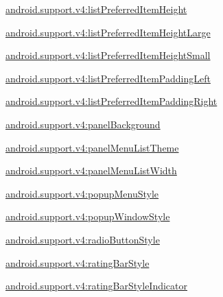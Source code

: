 {\ttfamily \hyperlink{classandroid_1_1support_1_1v4_1_1R_1_1styleable_a9b71c2c15e2b7ab9c0f8f48771d4444e}{android.\+support.\+v4\+:list\+Preferred\+Item\+Height}}

{\ttfamily \hyperlink{classandroid_1_1support_1_1v4_1_1R_1_1styleable_a4bf9947a5a52f076cfc439791fc78ac5}{android.\+support.\+v4\+:list\+Preferred\+Item\+Height\+Large}}

{\ttfamily \hyperlink{classandroid_1_1support_1_1v4_1_1R_1_1styleable_aad0605b48a4d815b0fdc77f1e4dacb4d}{android.\+support.\+v4\+:list\+Preferred\+Item\+Height\+Small}}

{\ttfamily \hyperlink{classandroid_1_1support_1_1v4_1_1R_1_1styleable_ae536509d1f248feded607e1588900608}{android.\+support.\+v4\+:list\+Preferred\+Item\+Padding\+Left}}

{\ttfamily \hyperlink{classandroid_1_1support_1_1v4_1_1R_1_1styleable_af5e021a7f52cfdc13201bf047025d17d}{android.\+support.\+v4\+:list\+Preferred\+Item\+Padding\+Right}}

{\ttfamily \hyperlink{classandroid_1_1support_1_1v4_1_1R_1_1styleable_a9a25be61219ea77461c9e13d61a6eb9c}{android.\+support.\+v4\+:panel\+Background}}

{\ttfamily \hyperlink{classandroid_1_1support_1_1v4_1_1R_1_1styleable_a70447b234629ffb93fa09bdc74f87251}{android.\+support.\+v4\+:panel\+Menu\+List\+Theme}}

{\ttfamily \hyperlink{classandroid_1_1support_1_1v4_1_1R_1_1styleable_a9241d227f19a221bfd726409aaf1ba40}{android.\+support.\+v4\+:panel\+Menu\+List\+Width}}

{\ttfamily \hyperlink{classandroid_1_1support_1_1v4_1_1R_1_1styleable_ae139527d680dba1ecff676f185c65505}{android.\+support.\+v4\+:popup\+Menu\+Style}}

{\ttfamily \hyperlink{classandroid_1_1support_1_1v4_1_1R_1_1styleable_a36a238eb7c745d998ccfc9bd0e0d4e8c}{android.\+support.\+v4\+:popup\+Window\+Style}}

{\ttfamily \hyperlink{classandroid_1_1support_1_1v4_1_1R_1_1styleable_a72d4902394fb50357cc43cdbde732b4c}{android.\+support.\+v4\+:radio\+Button\+Style}}

{\ttfamily \hyperlink{classandroid_1_1support_1_1v4_1_1R_1_1styleable_a217122fd42bd5c2c280789d4142eb012}{android.\+support.\+v4\+:rating\+Bar\+Style}}

{\ttfamily \hyperlink{classandroid_1_1support_1_1v4_1_1R_1_1styleable_ac0468ac4481514ec954acde9fbd2d3dc}{android.\+support.\+v4\+:rating\+Bar\+Style\+Indicator}}

